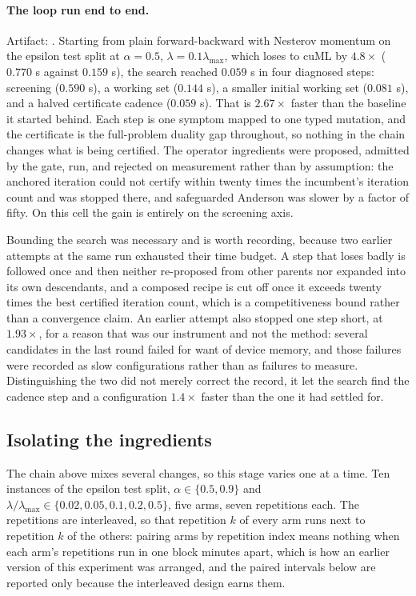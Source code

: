\paragraph{The loop run end to end.}
Artifact: . Starting from
plain forward-backward with Nesterov momentum on the epsilon test split at
$\alpha=0.5$, $\lambda=0.1\lambda_{\max}$, which loses to cuML by $4.8\times$
($0.770$ s against $0.159$ s), the search reached $0.059$ s in four diagnosed
steps: screening ($0.590$ s), a working set ($0.144$ s), a smaller initial
working set ($0.081$ s), and a halved certificate cadence ($0.059$ s). That is
$2.67\times$ faster than the baseline it started behind. Each step is one
symptom mapped to one typed mutation, and the certificate is the full-problem
duality gap throughout, so nothing in the chain changes what is being certified.
The operator ingredients were proposed, admitted by the gate, run, and rejected
on measurement rather than by assumption: the anchored iteration could not
certify within twenty times the incumbent's iteration count and was stopped
there, and safeguarded Anderson was slower by a factor of fifty. On this cell
the gain is entirely on the screening axis.

Bounding the search was necessary and is worth recording, because two earlier
attempts at the same run exhausted their time budget. A step that loses badly is
followed once and then neither re-proposed from other parents nor expanded into
its own descendants, and a composed recipe is cut off once it exceeds twenty
times the best certified iteration count, which is a competitiveness bound
rather than a convergence claim. An earlier attempt also stopped one step short,
at $1.93\times$, for a reason that was our instrument and not the method: several
candidates in the last round failed for want of device memory, and those
failures were recorded as slow configurations rather than as failures to
measure. Distinguishing the two did not merely correct the record, it let the
search find the cadence step and a configuration $1.4\times$ faster than the one
it had settled for.

\subsection{Isolating the ingredients}
\label{app:log:ablation}

 The chain above mixes several changes, so
this stage varies one at a time. Ten instances of the epsilon test split,
$\alpha \in \{0.5, 0.9\}$ and $\lambda/\lambda_{\max} \in \{0.02, 0.05, 0.1, 0.2,
0.5\}$, five arms, seven repetitions each. The repetitions are interleaved, so
that repetition $k$ of every arm runs next to repetition $k$ of the others:
pairing arms by repetition index means nothing when each arm's repetitions run
in one block minutes apart, which is how an earlier version of this experiment
was arranged, and the paired intervals below are reported only because the
interleaved design earns them.


